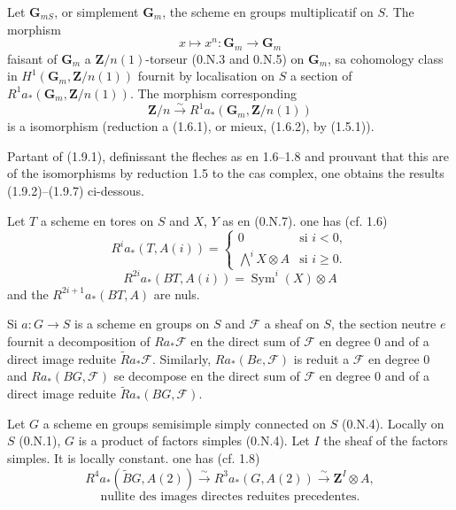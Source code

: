 \documentclass[11pt,a4paper]{article}
\theoremstyle{plain}
\theoremstyle{definition}
\DeclareMathOperator{\Sym}{Sym}
\begin{document}
Let $\mathbf{G}_{mS}$, or simplement $\mathbf{G}_m$, the scheme en groups multiplicatif on $S$. The morphism
\[
x \mapsto x^n : \mathbf{G}_m \to \mathbf{G}_m
\]
faisant of $\mathbf{G}_m$ a $\mathbf{Z}/n(1)$-torseur (0.N.3 and 0.N.5) on $\mathbf{G}_m$, sa cohomology class in $H^1(\mathbf{G}_m, \mathbf{Z}/n(1))$ fournit by localisation on $S$ a section of $R^1 a_* (\mathbf{G}_m, \mathbf{Z}/n(1))$. The morphism corresponding
\begin{equation}\label{1.9.1}
\mathbf{Z}/n \xrightarrow{\sim} R^1 a_* (\mathbf{G}_m, \mathbf{Z}/n(1))
\end{equation}
is a isomorphism (reduction a (1.6.1), or mieux, (1.6.2), by (1.5.1)).

Partant of (1.9.1), definissant the fleches as en 1.6--1.8 and prouvant that this are of the isomorphisms by reduction 1.5 to the cas complex, one obtains the results (1.9.2)--(1.9.7) ci-dessous.

Let $T$ a scheme en tores on $S$ and $X$, $Y$ as en (0.N.7). one has (cf. 1.6)
\begin{equation}\label{1.9.2}
R^i a_* (T, A(i)) =
\begin{cases}
0 & \text{si } i < 0, \\
\bigwedge^i X \otimes A & \text{si } i \geq 0.
\end{cases}
\end{equation}
\begin{equation}\label{1.9.3}
R^{2i} a_* (BT, A(i)) = \Sym^i(X) \otimes A
\end{equation}
and the $R^{2i+1} a_* (BT, A)$ are nuls.

Si $a : G \to S$ is a scheme en groups on $S$ and $\mathscr{F}$ a sheaf on $S$, the section neutre $e$ fournit a decomposition of $R a_* \mathscr{F}$ en the direct sum of $\mathscr{F}$ en degree 0 and of a direct image reduite $\widetilde{R} a_* \mathscr{F}$. Similarly, $R a_*(Be, \mathscr{F})$ is reduit a $\mathscr{F}$ en degree 0 and $R a_*(BG, \mathscr{F})$ se decompose en the direct sum of $\mathscr{F}$ en degree 0 and of a direct image reduite $\widetilde{R} a_*(BG, \mathscr{F})$.

Let $G$ a scheme en groups semisimple simply connected on $S$ (0.N.4). Locally on $S$ (0.N.1), $G$ is a product of factors simples (0.N.4). Let $I$ the sheaf of the factors simples. It is locally constant. one has (cf. 1.8)
\begin{equation}\label{1.9.4}
R^4 a_*(\widetilde{B}G, A(2)) \xrightarrow{\sim} R^3 a_*(G, A(2)) \xrightarrow{\sim} \mathbf{Z}^I \otimes A,
\end{equation}
\begin{equation}\label{1.9.5}
\text{nullite des images directes reduites precedentes.}
\end{equation}
\end{document}
